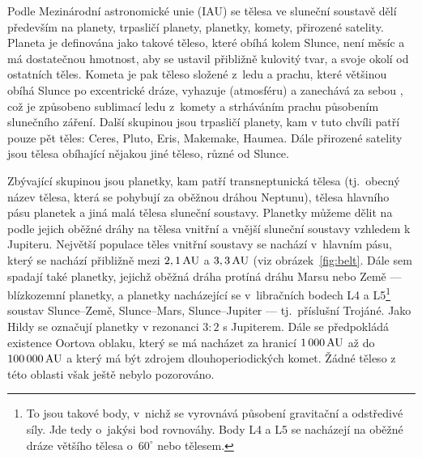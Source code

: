 \documentclass[A4paper, 12pt, oneside]{book}
\begin{document}
Podle Mezinárodní astronomické unie (IAU) se tělesa ve sluneční soustavě dělí především na planety, trpasličí planety, planetky, komety, přirozené satelity. Planeta je definována jako takové těleso, které obíhá kolem Slunce, není měsíc a má dostatečnou hmotnost, aby se ustavil přibližně kulovitý tvar, a  svoje okolí od ostatních těles. Kometa je pak těleso složené z~ledu a prachu, které většinou obíhá Slunce po excentrické dráze, vyhazuje  (atmosféru) a zanechává za sebou , což je způsobeno sublimací ledu z~komety a strháváním prachu působením slunečního záření. Další skupinou jsou trpasličí planety, kam v tuto chvíli patří pouze pět těles: Ceres, Pluto, Eris, Makemake, Haumea. Dále přirozené satelity jsou tělesa obíhající nějakou jiné těleso, různé od Slunce.

Zbývající skupinou jsou planetky, kam patří transneptunická tělesa (tj.\ obecný název tělesa, která se pohybují za oběžnou dráhou Neptunu), tělesa hlavního pásu planetek a jiná malá tělesa sluneční soustavy. Planetky můžeme dělit na podle jejich oběžné dráhy na tělesa vnitřní a vnější sluneční soustavy vzhledem k Jupiteru. Největší populace těles vnitřní soustavy se nachází v~hlavním pásu, který se nachází přibližně mezi $2,1\, {\rm AU}$ a $3,3\, {\rm AU}$ (viz obrázek~\ref{fig:belt}. Dále sem spadají také planetky, jejichž oběžná dráha protíná dráhu Marsu nebo Země --- blízkozemní planetky, a planetky nacházející se v~libračních bodech L4 a L5\footnote{To jsou takové body, v~nichž se vyrovnává působení gravitační a odstředivé síly. Jde tedy o~jakýsi bod rovnováhy. Body L4 a L5 se nacházejí na oběžné dráze většího tělesa o~$60^\circ$  nebo  tělesem.} soustav Slunce--Země, Slunce--Mars, Slunce--Jupiter --- tj.\ příslušní Trojáné. Jako Hildy se označují planetky v rezonanci $3:2$ s Jupiterem. Dále se předpokládá existence Oortova oblaku, který se má nacházet za hranicí $1\,000\,{\rm AU}$ až do $100\,000\,{\rm AU}$ a který má být zdrojem dlouhoperiodických komet. Žádné těleso z této oblasti však ještě nebylo pozorováno.
\end{document}

